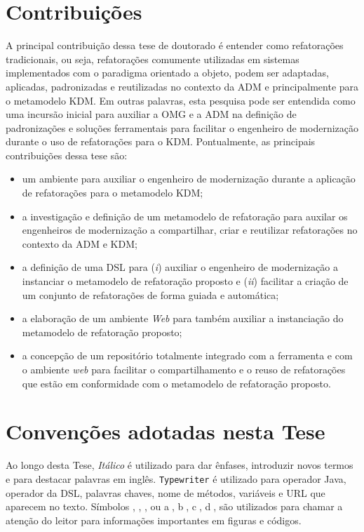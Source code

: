 \section{Contribuições}\label{sec:contribuicoes}

A principal contribuição dessa tese de doutorado é entender como refatorações tradicionais, ou seja, refatorações comumente utilizadas em sistemas implementados com o paradigma orientado a objeto, podem ser adaptadas, aplicadas, padronizadas e reutilizadas no contexto da ADM e principalmente para o metamodelo KDM. Em outras palavras, esta pesquisa pode ser entendida como uma incursão inicial para auxiliar a OMG e a ADM na definição de padronizações e soluções ferramentais para facilitar o engenheiro de modernização durante o uso de refatorações para o KDM. Pontualmente, as principais contribuições dessa tese são:

\begin{itemize}
	\item um ambiente para auxiliar o engenheiro de modernização durante a aplicação de refatorações para o metamodelo KDM;
	\item a investigação e definição de um metamodelo de refatoração para auxilar os engenheiros de modernização a compartilhar, criar e reutilizar refatorações no contexto da ADM e KDM;
	\item a definição de uma DSL para (\textit{i}) auxiliar o engenheiro de modernização a instanciar o metamodelo de refatoração proposto e (\textit{ii}) facilitar a criação de um conjunto de refatorações de forma guiada e automática;
	\item a elaboração de um ambiente \emph{Web} para também auxiliar a instanciação do metamodelo de refatoração proposto;
	\item a concepção de um repositório totalmente integrado com a ferramenta e com o ambiente \emph{web} para facilitar o compartilhamento e o reuso de refatorações que estão em conformidade com o metamodelo de refatoração proposto.
\end{itemize}
    
\section{Convenções adotadas nesta Tese}\label{sec:convencoes}

Ao longo desta Tese, \textit{Itálico} é utilizado para dar ênfases, introduzir novos termos e para destacar palavras em inglês. \texttt{Typewriter} é utilizado para operador Java, operador da DSL, palavras chaves, nome de métodos, variáveis e URL que aparecem no texto. Símbolos , , ,  ou \textcircled{a}, \textcircled{b}, \textcircled{c}, \textcircled{d}, são utilizados para chamar a atenção do leitor para informações importantes em figuras e códigos.

